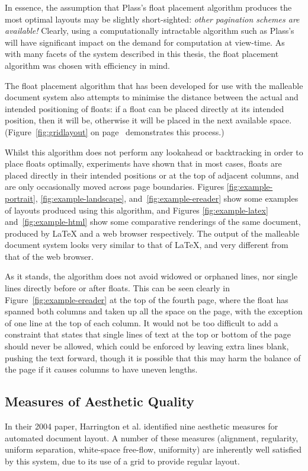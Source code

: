 In essence, the assumption that Plass's float placement algorithm produces the most optimal layouts may be slightly short-sighted: \emph{other pagination schemes are available!} Clearly, using a computationally intractable algorithm such as Plass's will have significant impact on the demand for computation at view-time. As with many facets of the system described in this thesis, the float placement algorithm was chosen with efficiency in mind.

The float placement algorithm that has been developed for use with the malleable document system also attempts to minimise the distance between the actual and intended positioning of floats: if a float can be placed directly at its intended position, then it will be, otherwise it will be placed in the next available space. (Figure~\ref{fig:gridlayout} on page~\pageref{fig:gridlayout} demonstrates this process.)

Whilst this algorithm does not perform any lookahead or backtracking in order to place floats optimally, experiments have shown that in most cases, floats are placed directly in their intended positions or at the top of adjacent columns, and are only occasionally moved across page boundaries. Figures \ref{fig:example-portrait}, \ref{fig:example-landscape}, and~\ref{fig:example-ereader} show some examples of layouts produced using this algorithm, and Figures \ref{fig:example-latex} and~\ref{fig:example-html} show some comparative renderings of the same document, produced by \LaTeX{} and a web browser respectively. The output of the malleable document system looks very similar to that of \LaTeX, and very different from that of the web browser.

As it stands, the algorithm does not avoid widowed or orphaned lines, nor single lines directly before or after floats. This can be seen clearly in Figure~\ref{fig:example-ereader} at the top of the fourth page, where the float has spanned both columns and taken up all the space on the page, with the exception of one line at the top of each column. It would not be too difficult to add a constraint that states that single lines of text at the top or bottom of the page should never be allowed, which could be enforced by leaving extra lines blank, pushing the text forward, though it is possible that this may harm the balance of the page if it causes columns to have uneven lengths.


\subsection{Measures of Aesthetic Quality}
In their 2004 paper, Harrington et al.\hspace{0pt}\cite{Harrington2004} identified nine aesthetic measures for automated document layout. A number of these measures (alignment, regularity, uniform separation, white-space free-flow, uniformity) are inherently well satisfied by this system, due to its use of a grid to provide regular layout. 

